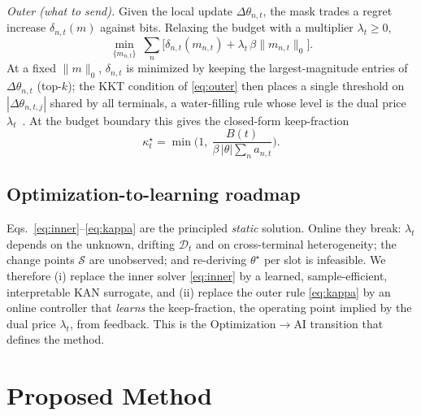 \documentclass[journal]{IEEEtran}
\begin{document}
\emph{Outer (what to send).} Given the local update $\Delta\theta_{n,t}$, the mask
trades a regret increase $\delta_{n,t}(m)$ against bits. Relaxing the budget with a
multiplier $\lambda_t\ge0$,
\begin{equation}
\min_{\{m_{n,t}\}}\ \sum_n\Big[\delta_{n,t}(m_{n,t})+\lambda_t\,\beta\|m_{n,t}\|_0\Big].
\label{eq:outer}
\end{equation}
At a fixed $\|m\|_0$, $\delta_{n,t}$ is minimized by keeping the largest-magnitude
entries of $\Delta\theta_{n,t}$ (top-$k$); the KKT condition of \eqref{eq:outer}
then places a single threshold on $|\Delta\theta_{n,t,j}|$ shared by all terminals,
a water-filling rule whose level is the dual price $\lambda_t$~\cite{boyd2004convex}. At the budget
boundary this gives the closed-form keep-fraction
\begin{equation}
\kappa_t^{\star}=\min\!\Big(1,\ \frac{B(t)}{\beta\,|\theta|\sum_n a_{n,t}}\Big).
\label{eq:kappa}
\end{equation}

\subsection{Optimization-to-learning roadmap}
Eqs.~\eqref{eq:inner}--\eqref{eq:kappa} are the principled \emph{static} solution.
Online they break: $\lambda_t$ depends on the unknown, drifting $\mathcal D_t$ and
on cross-terminal heterogeneity; the change points $\mathcal S$ are unobserved; and
re-deriving $\theta^{\star}$ per slot is infeasible. We therefore (i) replace the
inner solver \eqref{eq:inner} by a learned, sample-efficient, interpretable KAN
surrogate, and (ii) replace the outer rule \eqref{eq:kappa} by an online controller
that \emph{learns} the keep-fraction, the operating point implied by the dual price
$\lambda_t$, from feedback. This is the
Optimization$\to$AI transition that defines the method.

\section{Proposed Method}\label{sec:method}
\end{document}
